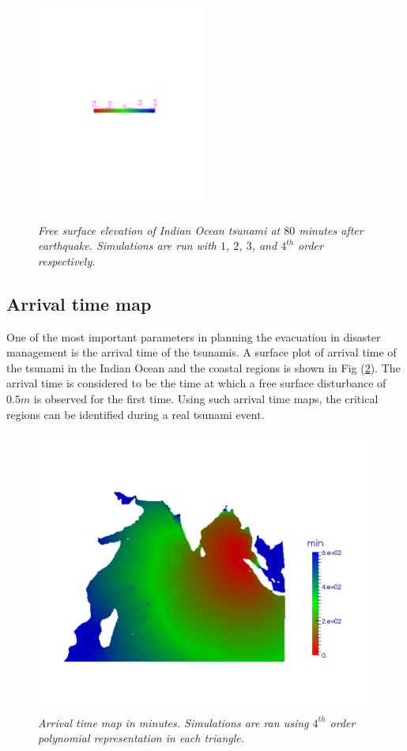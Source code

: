 \begin{figure}
\begin{center}
{\begin{minipage}[c]{0.45\linewidth}
  \end{minipage}}\\
  \centering
   \includegraphics[trim=6cm 11cm 5cm 10.5cm,clip=true,width=0.5\textwidth]{./figures/TsunamiLegend.pdf}
\end{center}
 \caption{\emph{Free surface elevation of Indian Ocean tsunami at $80$ minutes
after earthquake. Simulations are run with $1$, $2$, $3$, and $4^{th}$ order
respectively.}}
  \label{fig:tsunami_propagation_compare_N}
\end{figure}


\subsection{Arrival time map}
One of the most important parameters in planning the evacuation in disaster management is the arrival time of the tsunamis. A surface plot of arrival time of the tsunami in the Indian Ocean and the coastal regions is shown in Fig (\ref{fig:arrivalTimeMap}). The arrival time is considered to be the time at which a free surface disturbance of $0.5m$ is observed for the first time. Using such arrival time maps, the critical regions can be identified during a real tsunami event. 
\begin{figure}[h!]
\begin{center}
\includegraphics[trim=2cm 3cm 0cm 4cm,clip=true,width=0.5\linewidth]{./figures/arrivalTimeMapConN4.pdf}
\caption{\emph{Arrival time map in minutes. Simulations are ran using $4^{th}$ order polynomial representation in each triangle.}}
\label{fig:arrivalTimeMap}
\end{center}
\end{figure}

